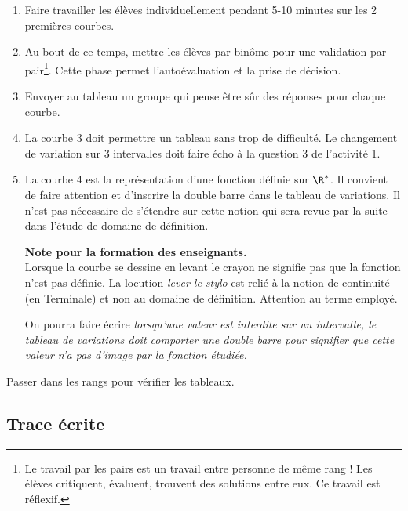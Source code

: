 \begin{enumerate}
\item Faire travailler les élèves individuellement pendant 5-10 minutes sur les 2 premières courbes.
\item Au bout de ce temps, mettre les élèves par binôme pour une validation par pair\footnote{Le travail par les pairs est un travail entre personne de même rang ! Les élèves critiquent, évaluent, trouvent des solutions entre eux. Ce travail est réflexif.}. Cette phase permet l'autoévaluation et la prise de décision.
\item Envoyer au tableau un groupe qui pense être sûr des réponses pour chaque courbe. 
\item La courbe 3 doit permettre un tableau sans trop de difficulté. Le changement de variation sur 3 intervalles doit faire écho à la question 3 de l'activité 1.
\item La courbe 4 est la représentation d'une fonction définie sur $\R^*$. Il convient de faire attention et d'inscrire la double barre dans le tableau de variations. Il n'est pas nécessaire de s'étendre sur cette notion qui sera revue par la suite dans l'étude de domaine de définition.
\begin{Att}
\textbf{Note pour la formation des enseignants.}\\
Lorsque la courbe se dessine en levant le crayon ne signifie pas que la fonction n'est pas définie. La locution \textit{lever le stylo} est relié à la notion de continuité (en Terminale) et non au domaine de définition. Attention au terme employé.

On pourra faire écrire \textit{lorsqu'une valeur est \textit{interdite} sur un intervalle, le tableau de variations doit comporter une double barre pour signifier que cette valeur n'a pas d'image par la fonction étudiée.} 
\end{Att}
\end{enumerate}

Passer dans les rangs pour vérifier les tableaux.

\subsection{Trace écrite}

